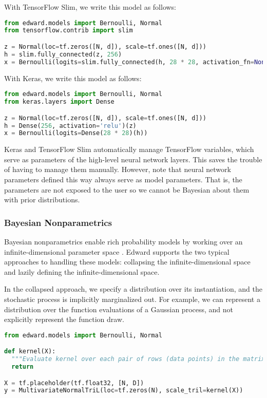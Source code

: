 With TensorFlow Slim, we write this model as follows:

\begin{lstlisting}[language=python]
from edward.models import Bernoulli, Normal
from tensorflow.contrib import slim

z = Normal(loc=tf.zeros([N, d]), scale=tf.ones([N, d]))
h = slim.fully_connected(z, 256)
x = Bernoulli(logits=slim.fully_connected(h, 28 * 28, activation_fn=None))
\end{lstlisting}

With Keras, we write this model as follows:

\begin{lstlisting}[language=python]
from edward.models import Bernoulli, Normal
from keras.layers import Dense

z = Normal(loc=tf.zeros([N, d]), scale=tf.ones([N, d]))
h = Dense(256, activation='relu')(z)
x = Bernoulli(logits=Dense(28 * 28)(h))
\end{lstlisting}

Keras and TensorFlow Slim automatically manage TensorFlow variables, which
serve as parameters of the high-level neural network layers. This
saves the trouble of having to manage them manually. However, note
that neural network parameters defined this way always serve as model
parameters. That is, the parameters are not exposed to the user so we
cannot be Bayesian about them with prior distributions.

\subsubsection{Bayesian Nonparametrics}

Bayesian nonparametrics enable rich probability models by working over
an infinite-dimensional parameter space \citep{hjort2010bayesian}.
Edward supports the two typical approaches to handling these models:
collapsing the infinite-dimensional space and lazily defining the
infinite-dimensional space.

In the collapsed approach, we specify a distribution over its
instantiation, and the stochastic process is implicitly marginalized
out. For example, we can represent a distribution over the function
evaluations of a Gaussian process, and not explicitly represent the
function draw.

\begin{lstlisting}[language=Python]
from edward.models import Bernoulli, Normal

def kernel(X):
  """Evaluate kernel over each pair of rows (data points) in the matrix."""
  return

X = tf.placeholder(tf.float32, [N, D])
y = MultivariateNormalTriL(loc=tf.zeros(N), scale_tril=kernel(X))
\end{lstlisting}

